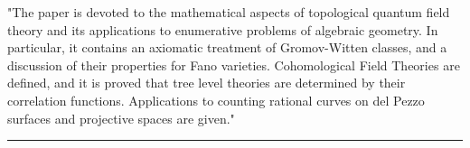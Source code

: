 "The paper is devoted to the mathematical aspects of topological
quantum field theory and its applications to enumerative problems
of algebraic geometry. In particular, it contains an axiomatic
treatment of Gromov-Witten classes, and a discussion of their
properties for Fano varieties. Cohomological Field Theories
are defined, and it is proved that tree level theories
are determined by their correlation functions. Applications
to counting rational curves on del Pezzo surfaces and projective
spaces are given."
\par\noindent\rule{\textwidth}{0.4pt}

